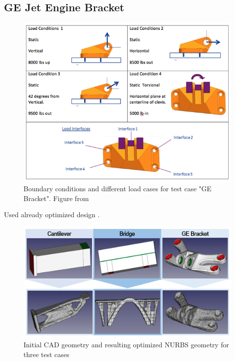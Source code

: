 \subsection{GE Jet Engine Bracket}
\begin{figure}[H]
\begin{center}
\includegraphics[width=\textwidth]{Pictures/GEbracket.png}
\end{center}
\caption{Boundary conditions and different load cases for test case "GE Bracket". Figure from \cite{GEBracket}}
\end{figure}
Used already optimized design \cite{GEBracketTripon}.


\begin{figure}
\begin{center}
\includegraphics[width = \textwidth]{Pictures/TestCases.png}
\end{center}
\caption{Initial CAD geometry and resulting optimized NURBS geometry for three test cases}
\end{figure}

